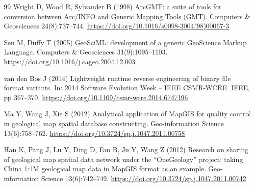 \documentclass[11pt,a4paper]{article}
\begin{document}
\begin{thebibliography}{99}
Wright D, Wood R, Sylvander B (1998) ArcGMT: a suite of tools for conversion between Arc/INFO and Generic Mapping Tools (GMT). Computers \& Geosciences 24(8):737--744. \url{https://doi.org/10.1016/s0098-3004(98)00067-3}

Sen M, Duffy T (2005) GeoSciML: development of a generic GeoScience Markup Language. Computers \& Geosciences 31(9):1095--1103. \url{https://doi.org/10.1016/j.cageo.2004.12.003}

van den Bos J (2014) Lightweight runtime reverse engineering of binary file format variants. In: 2014 Software Evolution Week -- IEEE CSMR-WCRE. IEEE, pp 367--370. \url{https://doi.org/10.1109/csmr-wcre.2014.6747196}

Ma Y, Wang J, Xie S (2012) Analytical application of MapGIS for quality control in geological map spatial database constructing. Geo-information Science 13(6):758--762. \url{https://doi.org/10.3724/sp.j.1047.2011.00758}

Han K, Pang J, Lu Y, Ding D, Fan B, Ju Y, Wang Z (2012) Research on sharing of geological map spatial data network under the ``OneGeology'' project: taking China 1:1M geological map data in MapGIS format as an example. Geo-information Science 13(6):742--749. \url{https://doi.org/10.3724/sp.j.1047.2011.00742}
\end{thebibliography}
\end{document}
